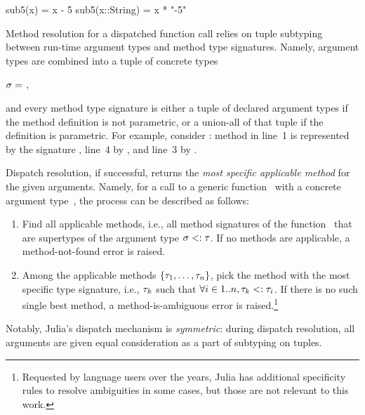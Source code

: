 \begin{codeenvd}
\begin{julia}
sub5(x) = x - 5
sub5(x::String) = x * "-5"
\end{julia}
\end{codeenvd}

Method resolution for a dispatched function call 
relies on tuple subtyping~\cite{bib:leavens:tuple-dispatch:1998}
between run-time argument types and method type signatures.
Namely, argument types are combined into a tuple of concrete types
\begin{center}
  $\sigma =$ ,
\end{center}
and every method type signature is either a tuple of declared argument types
if the method definition is not parametric, or a union-all of that tuple
if the definition is parametric.
For example, consider : method in line~1
is represented by the signature , line~4 by
, and line~3 by
.

Dispatch resolution, if successful, returns the \emph{most specific applicable
method} for the given arguments.
Namely, for a call to a generic function~ with a concrete argument
type~\gty, the process can be described as follows:
\begin{enumerate}
  \item Find all applicable methods, i.e., all method signatures \ty of the
    function~ that are supertypes of the argument type $\sigma <: \tau$.
    If no methods are applicable, a method-not-found error is raised.
  \item Among the applicable methods $\{\tau_1, \ldots, \tau_n\}$,
    pick the method with the most specific type signature,
    i.e., $\tau_k$ such that $\forall i\in1..n, \tau_k <: \tau_i$.
    If there is no such single best method, a method-is-ambiguous
    error is raised.\footnote{Requested by language users over the years,
    Julia has additional specificity rules to resolve ambiguities in some cases,
    but those are not relevant to this work.}
\end{enumerate}
Notably, Julia's dispatch mechanism is \emph{symmetric}:
during dispatch resolution, all arguments are given
equal consideration as a part of subtyping on tuples.

